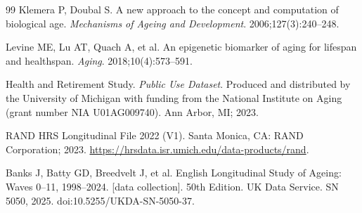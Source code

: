 \documentclass[11pt,a4paper]{article}
\begin{document}
\begin{thebibliography}{99}
 Klemera P, Doubal S. A new approach to the concept and computation of
biological age. \textit{Mechanisms of Ageing and Development}. 2006;127(3):240--248.

 Levine ME, Lu AT, Quach A, et al. An epigenetic biomarker of aging for
lifespan and healthspan. \textit{Aging}. 2018;10(4):573--591.

 Health and Retirement Study. \textit{Public Use Dataset}. Produced and distributed
by the University of Michigan with funding from the National Institute on Aging (grant number
NIA U01AG009740). Ann Arbor, MI; 2023.

 RAND HRS Longitudinal File 2022 (V1). Santa Monica, CA: RAND Corporation; 2023.
\url{https://hrsdata.isr.umich.edu/data-products/rand}.

 Banks J, Batty GD, Breedvelt J, et al. English Longitudinal Study of Ageing:
Waves 0--11, 1998--2024. [data collection]. 50th Edition. UK Data Service. SN 5050, 2025.
doi:10.5255/UKDA-SN-5050-37.

\end{thebibliography}
\end{document}
